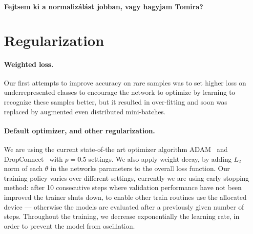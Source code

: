 \textbf{Fejtsem ki a normalizálást jobban, vagy hagyjam Tomira?}

\section{Regularization}

\paragraph{Weighted loss.}
Our first attempts to improve accuracy on rare samples was to set higher loss on underrepresented classes to encourage the network to optimize by learning to recognize these samples better, but it resulted in over-fitting and soon was replaced by augmented even distributed mini-batches.

\paragraph{Default optimizer, and other regularization.}
We are using the current state-of-the art optimizer algorithm ADAM~\cite{kingma_adam:_2014} and DropConnect~\cite{wan_regularization_2013} with $p=0.5$ settings. We also apply weight decay, by adding $L_2$ norm of each $\theta$ in the networks parameters to the overall loss function.
Our training policy varies over different settings, currently we are using early stopping method: after 10 consecutive steps where validation performance have not been improved the trainer shuts down, to enable other train routines use the allocated device --- otherwise the models are evaluated after a previously given number of steps. Throughout the training, we decrease exponentially the learning rate, in order to prevent the model from oscillation.
